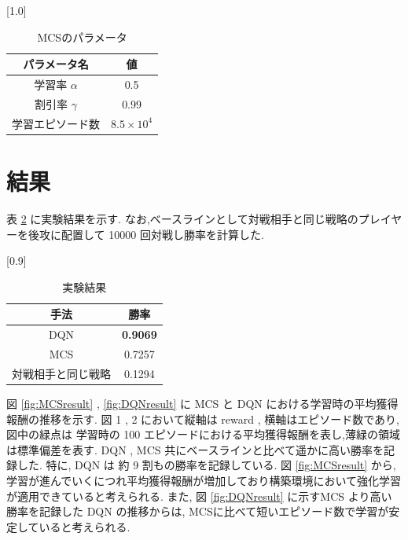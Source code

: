 \documentclass[twocolumn]{jarticle}
\begin{document}
    \begin{table}[t]
      \centering
      \caption{MCSのパラメータ}
      \vspace{-0.3cm}
      \label{table:mcsparam}
      \scalebox{1.0}[1.0]{
        \begin{tabular}{|c|c|}
          \hline
          パラメータ名 & 値 \\ \hline \hline
          学習率 $\alpha$ & 0.5 \\ \hline
          割引率 $\gamma$ & 0.99 \\ \hline     
          学習エピソード数 & $8.5 \times 10^4$ \\ \hline
    
          \end{tabular}
      }
      \end{table}


\section{結果}
表 \ref{table:result} に実験結果を示す. なお,ベースラインとして対戦相手と同じ戦略のプレイヤーを後攻に配置して 10000 回対戦し勝率を計算した.
\begin{table}[t]
  \centering
  \caption{実験結果}
  \vspace{-0.3cm}
  \label{table:result}
  \scalebox{0.9}[0.9]{
    \begin{tabular}{|c|c|}
      \hline
      手法 & 勝率 \\ \hline \hline
      DQN & \textbf{0.9069} \\ \hline
      MCS & 0.7257 \\ \hline     
      対戦相手と同じ戦略 & 0.1294 \\ \hline

      \end{tabular}
  }
  \end{table}

  図 \ref{fig:MCSresult} , \ref{fig:DQNresult} に MCS と DQN における学習時の平均獲得報酬の推移を示す. 図 1 , 2 において縦軸は reward , 横軸はエピソード数であり, 図中の緑点は 学習時の 100 エピソードにおける平均獲得報酬を表し,薄緑の領域は標準偏差を表す.
  DQN , MCS 共にベースラインと比べて遥かに高い勝率を記録した. 特に, DQN は 約 9 割もの勝率を記録している.
図 \ref{fig:MCSresult} から, 学習が進んでいくにつれ平均獲得報酬が増加しており構築環境において強化学習が適用できていると考えられる.
また, 図 \ref{fig:DQNresult} に示すMCS より高い勝率を記録した DQN の推移からは, MCSに比べて短いエピソード数で学習が安定していると考えられる.
\end{document}
